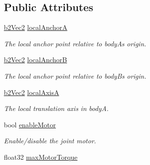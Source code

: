 \subsection*{Public Attributes}
\begin{DoxyCompactItemize}
\item 
\hyperlink{structb2_vec2}{b2\+Vec2} \hyperlink{structb2_wheel_joint_def_a9429d2273bfdd8bdc0db416e73b89ae4}{local\+AnchorA}\hypertarget{structb2_wheel_joint_def_a9429d2273bfdd8bdc0db416e73b89ae4}{}\label{structb2_wheel_joint_def_a9429d2273bfdd8bdc0db416e73b89ae4}

\begin{DoxyCompactList}\small\item\em The local anchor point relative to bodyA\textquotesingle{}s origin. \end{DoxyCompactList}\item 
\hyperlink{structb2_vec2}{b2\+Vec2} \hyperlink{structb2_wheel_joint_def_a88ba0f7108076b9d7ced68425be95c27}{local\+AnchorB}\hypertarget{structb2_wheel_joint_def_a88ba0f7108076b9d7ced68425be95c27}{}\label{structb2_wheel_joint_def_a88ba0f7108076b9d7ced68425be95c27}

\begin{DoxyCompactList}\small\item\em The local anchor point relative to bodyB\textquotesingle{}s origin. \end{DoxyCompactList}\item 
\hyperlink{structb2_vec2}{b2\+Vec2} \hyperlink{structb2_wheel_joint_def_ad635ee7b77b50037dc0e021a0f5c93a6}{local\+AxisA}\hypertarget{structb2_wheel_joint_def_ad635ee7b77b50037dc0e021a0f5c93a6}{}\label{structb2_wheel_joint_def_ad635ee7b77b50037dc0e021a0f5c93a6}

\begin{DoxyCompactList}\small\item\em The local translation axis in bodyA. \end{DoxyCompactList}\item 
bool \hyperlink{structb2_wheel_joint_def_a8e7193d6c34c784ffd71e79d3a70acc6}{enable\+Motor}\hypertarget{structb2_wheel_joint_def_a8e7193d6c34c784ffd71e79d3a70acc6}{}\label{structb2_wheel_joint_def_a8e7193d6c34c784ffd71e79d3a70acc6}

\begin{DoxyCompactList}\small\item\em Enable/disable the joint motor. \end{DoxyCompactList}\item 
float32 \hyperlink{structb2_wheel_joint_def_ab658ce0fae40c6de09133659f7ffb829}{max\+Motor\+Torque}\hypertarget{structb2_wheel_joint_def_ab658ce0fae40c6de09133659f7ffb829}{}\label{structb2_wheel_joint_def_ab658ce0fae40c6de09133659f7ffb829}


\end{DoxyCompactItemize}

